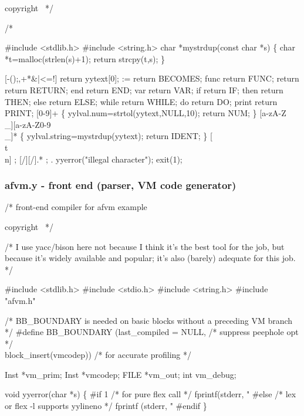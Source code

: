 \documentclass[10pt,english]{article}
\begin{document}
\LA{}copyright~{\nwtagstyle{}}\RA{}
*/

/* %

#include <stdlib.h>
#include <string.h>
char *mystrdup(const char *s)
\{
  char *t=malloc(strlen(s)+1);
  return strcpy(t,s);
\}

[-();,+*&|<=!]  return yytext[0];
:=     return BECOMES;
func   return FUNC;
return return RETURN;
end    return END;
var    return VAR;
if     return IF;
then   return THEN;
else   return ELSE;
while  return WHILE;
do     return DO;
print  return PRINT;
[0-9]+ \{ yylval.num=strtol(yytext,NULL,10); return NUM; \}
[a-zA-Z\\_][a-zA-Z0-9\\_]* \{ yylval.string=mystrdup(yytext); return IDENT; \}
[ \\t\\n] ;
[/][/].* ;
. yyerror("illegal character"); exit(1);
\nwendcode{}\nwdocspar


\subsubsection{afvm.y - front end (parser, VM code generator)}

\nwenddocs{}\endmoddef
/* front-end compiler for afvm example

\LA{}copyright~{\nwtagstyle{}}\RA{}
*/

/* I use yacc/bison here not because I think it's the best tool for
   the job, but because it's widely available and popular; it's also
   (barely) adequate for this job. */

#include <stdlib.h>
#include <stdio.h>
#include <string.h>
#include "afvm.h"

/* BB_BOUNDARY is needed on basic blocks without a preceding VM branch */
#define BB_BOUNDARY (last_compiled = NULL,  /* suppress peephole opt */ \\
                     block_insert(vmcodep)) /* for accurate profiling */

Inst *vm_prim;
Inst *vmcodep;
FILE *vm_out;
int vm_debug;

void yyerror(char *s)
\{
#if 1
  /* for pure flex call */
  fprintf(stderr, "%
#else
  /* lex or flex -l supports yylineno */
  fprintf (stderr, "%
#endif
\}
\end{document}
